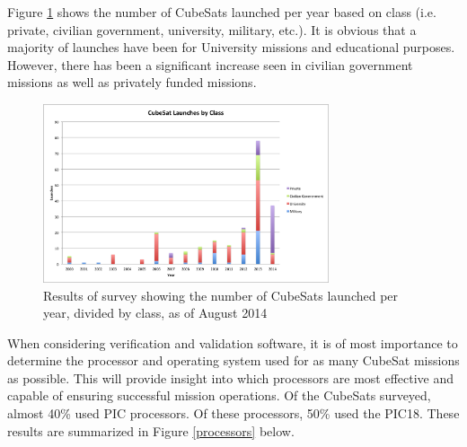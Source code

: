 \documentclass[11pt]{article}
\begin{document}
Figure \ref{classperyear} shows the number of CubeSats launched per year based on class (i.e. private, civilian government, university, military, etc.).  It is obvious that a majority of launches have been for University missions and educational purposes.  However, there has been a significant increase seen in civilian government missions as well as privately funded missions.  

\begin{figure}[ht!]
\centering
\includegraphics[width=0.75\textwidth]{ClassPerYear.png}
\caption{Results of survey showing the number of CubeSats launched per year, divided by class, as of August 2014}
\label{classperyear}
\end{figure}

When considering verification and validation software, it is of most importance to determine the processor and operating system used for as many CubeSat missions as possible.  This will provide insight into which processors are most effective and capable of ensuring successful mission operations.  Of the CubeSats surveyed, almost 40\% used PIC processors.  Of these processors, 50\% used the PIC18.  These results are summarized in Figure \ref{processors} below.
\end{document}
